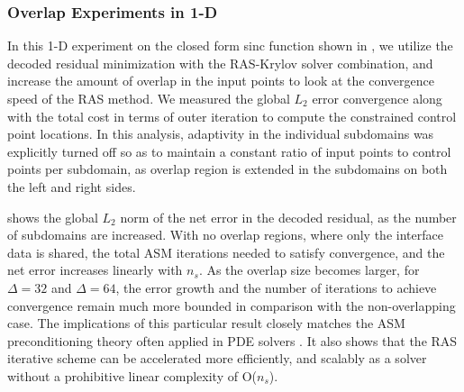 \subsubsection{Overlap Experiments in 1-D}

In this 1-D experiment on the closed form sinc function shown in , we utilize the decoded residual minimization with the RAS-Krylov solver combination, and increase the amount of overlap in the input points to look at the convergence speed of the RAS method. We measured the global $L_2$ error convergence along with the total cost in terms of outer iteration to compute the constrained control point locations. In this analysis, adaptivity in the individual subdomains was explicitly turned off so as to maintain a constant ratio of input points to control points per subdomain, as overlap region is extended in the subdomains on both the left and right sides.

 shows the global $L_2$ norm of the net error in the decoded residual, as the number of subdomains are increased. With no overlap regions, where only the interface data is shared, the total ASM iterations needed to satisfy convergence, and the net error increases linearly with $n_s$. As the overlap size becomes larger, for $\Delta=32$ and $\Delta=64$, the error growth and the number of iterations to achieve convergence remain much more bounded in comparison with the non-overlapping case. The implications of this particular result closely matches the ASM preconditioning theory often applied in PDE solvers \cite{smith-ddm, lions-asm, gander-rasm}. It also shows that the RAS iterative scheme can be accelerated more efficiently, and scalably as a solver without a prohibitive linear complexity of O($n_s$).

